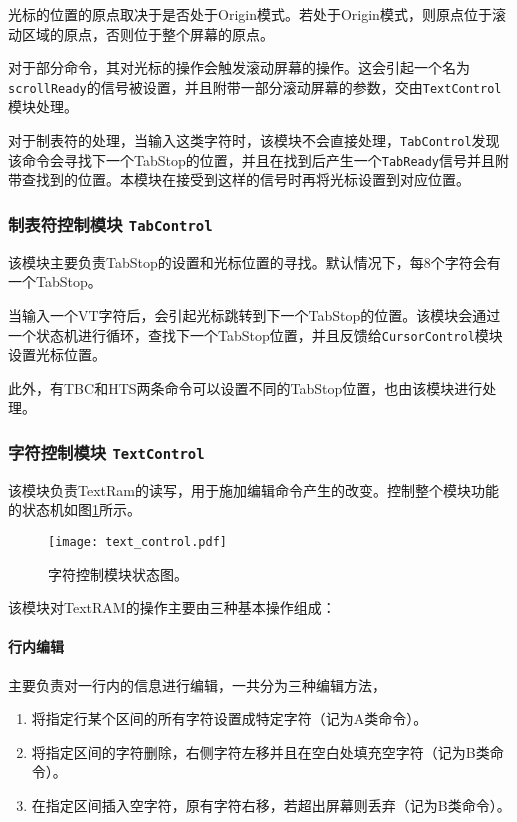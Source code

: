 光标的位置的原点取决于是否处于Origin模式。若处于Origin模式，则原点位于滚动区域的原点，否则位于整个屏幕的原点。

对于部分命令，其对光标的操作会触发滚动屏幕的操作。这会引起一个名为\texttt{scrollReady}的信号被设置，并且附带一部分滚动屏幕的参数，交由\texttt{TextControl}模块处理。

对于制表符的处理，当输入这类字符时，该模块不会直接处理，\texttt{TabControl}发现该命令会寻找下一个TabStop的位置，并且在找到后产生一个\texttt{TabReady}信号并且附带查找到的位置。本模块在接受到这样的信号时再将光标设置到对应位置。

\subsubsection{制表符控制模块 \texttt{TabControl}}
该模块主要负责TabStop的设置和光标位置的寻找。默认情况下，每8个字符会有一个TabStop。

当输入一个VT字符后，会引起光标跳转到下一个TabStop的位置。该模块会通过一个状态机进行循环，查找下一个TabStop位置，并且反馈给\texttt{CursorControl}模块设置光标位置。

此外，有TBC和HTS两条命令可以设置不同的TabStop位置，也由该模块进行处理。
\subsubsection{字符控制模块 \texttt{TextControl}}
该模块负责TextRam的读写，用于施加编辑命令产生的改变。控制整个模块功能的状态机如图\ref{fig:text_control}所示。

\begin{figure}[htbp]
\centerline{
\texttt{[image: text\_control.pdf]}
}
\caption{字符控制模块状态图。}
\label{fig:text_control}
\end{figure}

该模块对TextRAM的操作主要由三种基本操作组成：

\paragraph{行内编辑}
主要负责对一行内的信息进行编辑，一共分为三种编辑方法，
\begin{enumerate}
	\item 将指定行某个区间的所有字符设置成特定字符（记为A类命令）。
	\item 将指定区间的字符删除，右侧字符左移并且在空白处填充空字符（记为B类命令）。
	\item 在指定区间插入空字符，原有字符右移，若超出屏幕则丢弃（记为B类命令）。
\end{enumerate}

